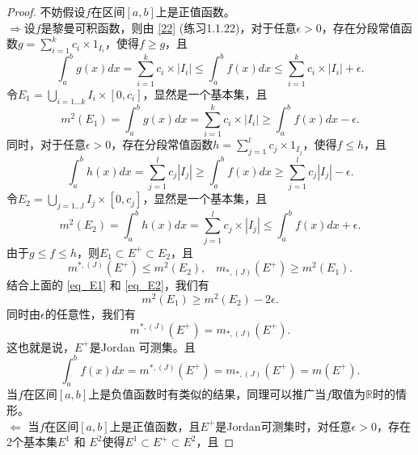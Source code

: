 \documentclass[reqno,a4paper,14pt]{amsart}
\newcommand{\abs}[1]{\left\vert#1\right\vert}
\begin{document}
\begin{proof}
    不妨假设$f$在区间$[a,b]$上是正值函数。\\
    $\Rightarrow$设$f$是黎曼可积函数，则由 \ref{22} (练习1.1.22)，对于任意$\epsilon>0$，存在分段常值函数$g=\sum_{i=1}^k c_i\times 1_{I_i}$，使得$f\geq g$，且
    \begin{equation*}
        \int_a^b g(x)dx =\sum_{i=1}^k c_i\times \abs{I_i}\leq \int_a^b f(x)dx \leq \sum_{i=1}^k c_i\times \abs{I_i}+\epsilon.
    \end{equation*}
    令$E_1=\bigcup_{i=1...k} I_i\times [0,c_i]$，显然是一个基本集，且
    \begin{equation}
        m^2(E_1)=\int_a^b g(x)dx=\sum_{i=1}^k c_i\times\abs{I_i}\geq \int_a^b f(x)dx -\epsilon.
        \label{eq_E1}
    \end{equation}
    同时，对于任意$\epsilon>0$，存在分段常值函数$h=\sum_{j=1}^l c_j\times 1_{I_j}$，使得$f\leq h$，且
    \begin{equation*}
        \int_a^b h(x)dx =\sum_{j=1}^l c_j\abs{I_j}\geq \int_a^b f(x)dx \geq \sum_{j=1}^l c_j\abs{I_j}-\epsilon.
    \end{equation*}
    令$E_2=\bigcup_{j=1...l} I_j\times [0,c_j]$，显然是一个基本集，且
    \begin{equation}
        m^2(E_2)=\int_a^b h(x)dx=\sum_{j=1}^l c_j\times\abs{I_j}\leq \int_a^b f(x)dx +\epsilon.
        \label{eq_E2}
    \end{equation}
    由于$g\leq f\leq h$，则$E_1\subset E^+\subset E_2$，且
    \begin{equation*}
        m^{*,(J)}(E^+)\leq m^2(E_2),\;\;\; m_{*,(J)}(E^+)\geq m^2(E_1).
    \end{equation*}
    结合上面的 \eqref{eq_E1} 和 \eqref{eq_E2}，我们有
    \begin{equation*}
        m^2(E_1)\geq m^2(E_2)- 2\epsilon.
    \end{equation*}
    同时由$\epsilon$的任意性，我们有
    \begin{equation*}
        m^{*,(J)}(E^+)=m_{*,(J)}(E^+).
    \end{equation*}
    这也就是说，$E^+$是Jordan 可测集。且
    \begin{equation*}
        \int_a^b f(x)dx=m^{*,(J)}(E^+)=m_{*,(J)}(E^+)=m(E^+).
    \end{equation*}
    当$f$在区间$[a,b]$上是负值函数时有类似的结果，同理可以推广当$f$取值为$\mathbb{R}$时的情形。\\
    $\Leftarrow$ 当$f$在区间$[a,b]$上是正值函数，且$E^+$是Jordan可测集时，对任意$\epsilon>0$，存在2个基本集$E^1$ 和 $E^2$使得$E^1\subset E^+\subset E^2$，且

\end{proof}
\end{document}
